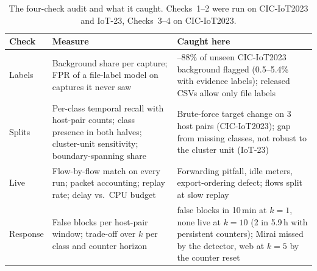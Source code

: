 \begin{table}[t]
\centering
\caption{The four-check audit and what it caught. Checks~1--2 were run on CIC-IoT2023 and IoT-23, Checks~3--4 on CIC-IoT2023.}
\label{tab:checklist}
\footnotesize
\setlength{\tabcolsep}{3pt}
\begin{tabular}{>{\raggedright\arraybackslash}p{1.1cm}>{\raggedright\arraybackslash}p{3.4cm}>{\raggedright\arraybackslash}p{3.5cm}}
\hline
Check & Measure & Caught here \\
\hline
1 Labels & Background share per capture; FPR of a file-label model on captures it never saw & 71--88\% of unseen CIC-IoT2023 background flagged (0.5--5.4\% with evidence labels); released CSVs allow only file labels \\
2 Splits & Per-class temporal recall with host-pair counts; class presence in both halves; cluster-unit sensitivity; boundary-spanning share & Brute-force target change on 3 host pairs (CIC-IoT2023); gap from missing classes, not robust to the cluster unit (IoT-23) \\
3 Live & Flow-by-flow match on every run; packet accounting; replay rate; delay vs.\ CPU budget & Forwarding pitfall, idle meters, export-ordering defect; flows split at slow replay \\
4 Response & False blocks per host-pair window; trade-off over $k$ per class and counter horizon & 60 false blocks in 10\,min at $k=1$, none live at $k=10$ (2 in 5.9\,h with persistent counters); Mirai missed by the detector, web at $k=5$ by the counter reset \\
\hline
\end{tabular}
\end{table}
